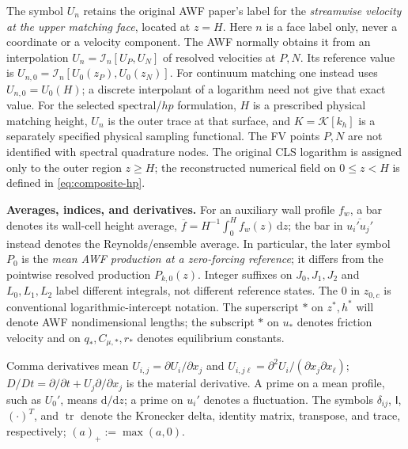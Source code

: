 \documentclass[11pt,a4paper]{article}
\numberwithin{equation}{section}
\newcommand{\dd}{\mathrm{d}}
\newcommand{\ust}{u_*}
\newcommand{\qs}{q_*}
\newcommand{\tr}{\operatorname{tr}}
\newcommand{\pos}[1]{\left(#1\right)_+}
\newcommand{\avg}[1]{\overline{#1}}
\newcommand{\I}{\mathsf{I}}
\begin{document}
The symbol $U_n$ retains the original AWF paper's label for the
\emph{streamwise velocity at the upper matching face}, located at $z=H$.
Here $n$ is a face label only, never a coordinate or a velocity component.
The AWF normally obtains it from an interpolation
$U_n=\mathcal I_n[U_P,U_N]$ of resolved velocities at $P,N$.
Its reference value is $U_{n,0}=\mathcal I_n[U_0(z_P),U_0(z_N)]$.
For continuum matching one instead uses $U_{n,0}=U_0(H)$; a discrete
interpolant of a logarithm need not give that exact value.
For the selected spectral/$hp$ formulation, $H$ is a prescribed physical
matching height, $U_n$ is the outer trace at that surface, and
$K=\mathcal K[k_h]$ is a separately specified physical sampling functional.
The FV points $P,N$ are not identified with spectral quadrature nodes.
The original CLS logarithm is assigned only to the outer region $z\geq H$;
the reconstructed numerical field on $0\leq z<H$ is defined in
\cref{eq:composite-hp}.

\textbf{Averages, indices, and derivatives.}
For an auxiliary wall profile $f_w$, a bar denotes its wall-cell height
average, $\avg f=H^{-1}\int_0^Hf_w(z)\,\dd z$; the bar in
$\avg{u_i'u_j'}$ instead denotes the Reynolds/ensemble average.
In particular, the later symbol $P_0$ is the \emph{mean AWF production
at a zero-forcing reference}; it differs from the pointwise resolved
production $P_{k,0}(z)$. Integer suffixes on $J_0,J_1,J_2$ and
$L_0,L_1,L_2$ label different integrals, not different reference states.
The $0$ in $z_{0,c}$ is conventional logarithmic-intercept notation.
The superscript $*$ on $z^*,h^*$ will denote AWF nondimensional lengths;
the subscript $*$ on $\ust$ denotes friction velocity and on
$\qs,C_{\mu,*},r_*$ denotes equilibrium constants.

Comma derivatives mean $U_{i,j}=\partial U_i/\partial x_j$ and
$U_{i,j\ell}=\partial^2U_i/(\partial x_j\partial x_\ell)$;
$D/Dt=\partial/\partial t+U_j\partial/\partial x_j$ is the material
derivative. A prime on a mean profile, such as $U_0'$, means $\dd/\dd z$;
a prime on $u_i'$ denotes a fluctuation. The symbols $\delta_{ij}$,
$\I$, $(\cdot)^T$, and $\tr$ denote the Kronecker delta, identity matrix,
transpose, and trace, respectively; $\pos a:=\max(a,0)$.
\end{document}

